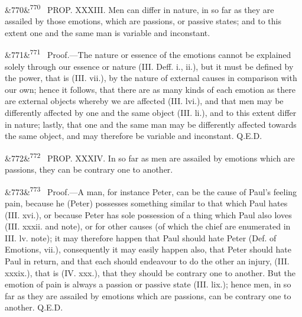 \documentclass[12pt]{article}
\newcommand{\para}[1][]{\par\noindent\ifx&#1&\else\textsuperscript{\footnotesize #1}~\fi}
\begin{document}
\para[770] PROP. XXXIII. Men can differ in nature, in so far as they are assailed by those emotions, which are passions, or passive states; and to this extent one and the same man is variable and inconstant.

\para[771] Proof.---The nature or essence of the emotions cannot be explained solely through our essence or nature (III. Deff. i., ii.), but it must be defined by the power, that is (III. vii.), by the nature of external causes in comparison with our own; hence it follows, that there are as many kinds of each emotion as there are external objects whereby we are affected (III. lvi.), and that men may be differently affected by one and the same object (III. li.), and to this extent differ in nature; lastly, that one and the same man may be differently affected towards the same object, and may therefore be variable and inconstant. Q.E.D.

\para[772] PROP. XXXIV. In so far as men are assailed by emotions which are passions, they can be contrary one to another.

\para[773] Proof.---A man, for instance Peter, can be the cause of Paul's feeling pain, because he (Peter) possesses something similar to that which Paul hates (III. xvi.), or because Peter has sole possession of a thing which Paul also loves (III. xxxii. and note), or for other causes (of which the chief are enumerated in III. lv. note); it may therefore happen that Paul should hate Peter (Def. of Emotions, vii.), consequently it may easily happen also, that Peter should hate Paul in return, and that each should endeavour to do the other an injury, (III. xxxix.), that is (IV. xxx.), that they should be contrary one to another. But the emotion of pain is always a passion or passive state (III. lix.); hence men, in so far as they are assailed by emotions which are passions, can be contrary one to another. Q.E.D.
\end{document}
